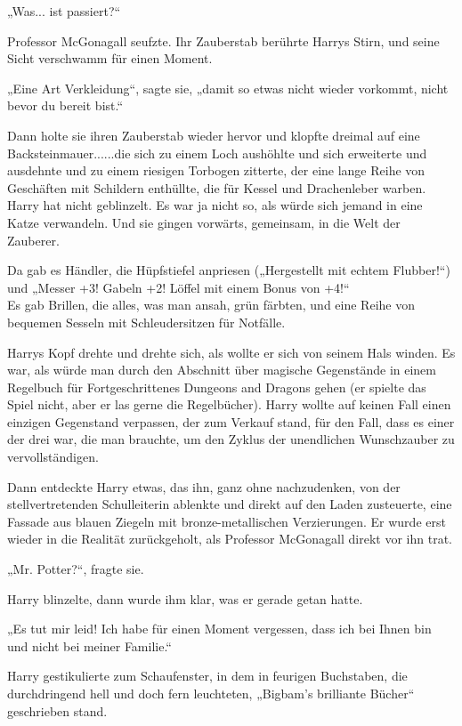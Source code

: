 {„Was... ist passiert?“

Professor McGonagall seufzte. Ihr Zauberstab berührte Harrys Stirn, und seine Sicht verschwamm für einen Moment.

„Eine Art Verkleidung“, sagte sie, „damit so etwas nicht wieder vorkommt, nicht bevor du bereit bist.“

Dann holte sie ihren Zauberstab wieder hervor und klopfte dreimal auf eine Backsteinmauer......die sich zu einem Loch aushöhlte und sich erweiterte und ausdehnte und zu einem riesigen Torbogen zitterte, der eine lange Reihe von Geschäften mit Schildern enthüllte, die für Kessel und Drachenleber warben. Harry hat nicht geblinzelt. Es war ja nicht so, als würde sich jemand in eine Katze verwandeln. Und sie gingen vorwärts, gemeinsam, in die Welt der Zauberer.

Da gab es Händler, die Hüpfstiefel anpriesen („Hergestellt mit echtem Flubber!“) und „Messer +3! Gabeln +2! Löffel mit einem Bonus von +4!“\\ Es gab Brillen, die alles, was man ansah, grün färbten, und eine Reihe von bequemen Sesseln mit Schleudersitzen für Notfälle.

Harrys Kopf drehte und drehte sich, als wollte er sich von seinem Hals winden. Es war, als würde man durch den Abschnitt über magische Gegenstände in einem Regelbuch für Fortgeschrittenes Dungeons and Dragons gehen (er spielte das Spiel nicht, aber er las gerne die Regelbücher). Harry wollte auf keinen Fall einen einzigen Gegenstand verpassen, der zum Verkauf stand, für den Fall, dass es einer der drei war, die man brauchte, um den Zyklus der unendlichen Wunschzauber zu vervollständigen.

Dann entdeckte Harry etwas, das ihn, ganz ohne nachzudenken, von der stellvertretenden Schulleiterin ablenkte und direkt auf den Laden zusteuerte, eine Fassade aus blauen Ziegeln mit bronze-metallischen Verzierungen. Er wurde erst wieder in die Realität zurückgeholt, als Professor McGonagall direkt vor ihn trat.

„Mr. Potter?“, fragte sie.

Harry blinzelte, dann wurde ihm klar, was er gerade getan hatte.

„Es tut mir leid! Ich habe für einen Moment vergessen, dass ich bei Ihnen bin und nicht bei meiner Familie.“

Harry gestikulierte zum Schaufenster, in dem in feurigen Buchstaben, die durchdringend hell und doch fern leuchteten, „Bigbam's brilliante Bücher“ geschrieben stand.

}
